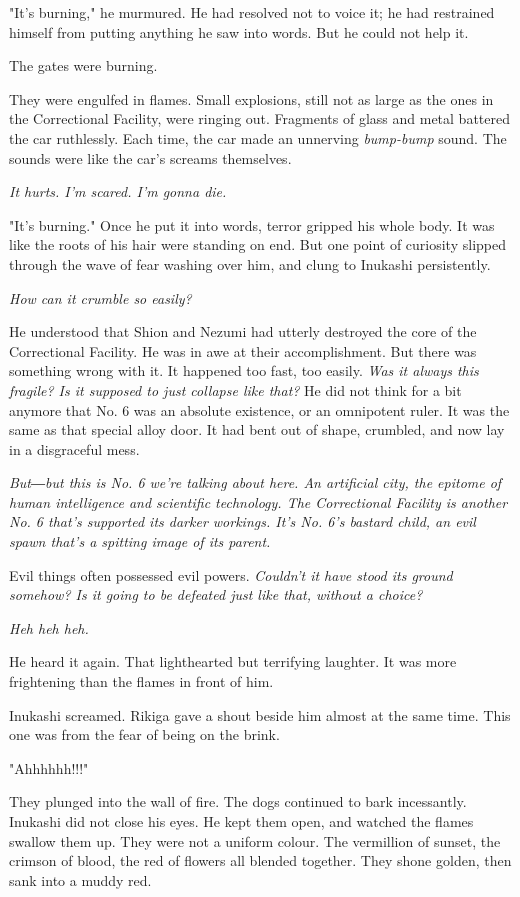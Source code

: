 "It's burning," he murmured. He had resolved not to voice it; he had
restrained himself from putting anything he saw into words. But he could
not help it.

The gates were burning.

They were engulfed in flames. Small explosions, still not as large as
the ones in the Correctional Facility, were ringing out. Fragments of
glass and metal battered the car ruthlessly. Each time, the car made an
unnerving \emph{bump-bump} sound. The sounds were like the car's screams
themselves.

\emph{It hurts. I'm scared. I'm gonna die.}

"It's burning." Once he put it into words, terror gripped his whole
body. It was like the roots of his hair were standing on end. But one
point of curiosity slipped through the wave of fear washing over him,
and clung to Inukashi persistently.

\emph{How can it crumble so easily?}

He understood that Shion and Nezumi had utterly destroyed the core of
the Correctional Facility. He was in awe at their accomplishment. But
there was something wrong with it. It happened too fast, too easily. \emph{Was
it always this fragile? Is it supposed to just collapse like that?} He
did not think for a bit anymore that No. 6 was an absolute existence, or
an omnipotent ruler. It was the same as that special alloy door. It had
bent out of shape, crumbled, and now lay in a disgraceful mess.

\emph{But―but this is No. 6 we're talking about here. An artificial city, the
epitome of human intelligence and scientific technology. The
Correctional Facility is another No. 6 that's supported its darker
workings. It's No. 6's bastard child, an evil spawn that's a spitting
image of its parent.}

Evil things often possessed evil powers. \emph{Couldn't it have stood its
ground somehow? Is it going to be defeated just like that, without a
choice?}

\emph{Heh heh heh.}

He heard it again. That lighthearted but terrifying laughter. It was
more frightening than the flames in front of him.

Inukashi screamed. Rikiga gave a shout beside him almost at the same
time. This one was from the fear of being on the brink.

"Ahhhhhh!!!"

They plunged into the wall of fire. The dogs continued to bark
incessantly. Inukashi did not close his eyes. He kept them open, and
watched the flames swallow them up. They were not a uniform colour. The
vermillion of sunset, the crimson of blood, the red of flowers all
blended together. They shone golden, then sank into a muddy red.

